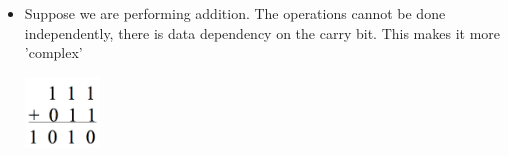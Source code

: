 \documentclass{article}
\begin{document}
\begin{itemize}
\begin{itemize}
\begin{itemize}
                    \item Suppose we are performing addition.
                            The operations cannot be done independently, there is data dependency on the carry bit. This makes it more 'complex'

                        \begin{minipage}{\linewidth}
                            \centering
                            \includegraphics[width=2cm, scale=1]{S2/additionCarry.PNG}
                        \end{minipage}
                \end{itemize}
        \end{itemize}
\end{itemize}

\newpage
\end{document}
